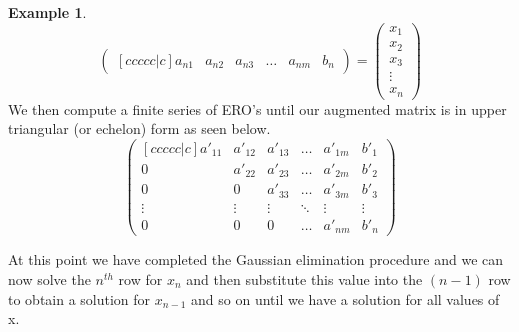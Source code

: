 \documentclass[12pt,reqno,twoside,titlepage]{article}
\theoremstyle{definition}
\newtheorem{exmp}{Example}[section]
\begin{document}
\begin{exmp}
\begin{equation*}
\begin{pmatrix}[ccccc|c]
a_{n1} & a_{n2} & a_{n3} & \dots & a_{nm} & b_{n}
\end{pmatrix}
=
\begin{pmatrix}
x_{1} \\
x_{2} \\
x_{3} \\
\vdots \\
x_{n}
\end{pmatrix}
\end{equation*}
We then compute a finite series of ERO’s until our augmented matrix is in upper triangular (or echelon) form as seen below.
\begingroup
\renewcommand*{\arraystretch}{1.5}
\begin{equation*}
    \begin{pmatrix}[ccccc|c]
    a'_{11} & a'_{12} & a'_{13} & \dots & a'_{1m} & b'_{1} \\
    0 & a'_{22} & a'_{23} & \dots & a'_{2m} & b'_{2} \\
    0 & 0 & a'_{33} & \dots & a'_{3m} & b'_{3} \\
    \vdots & \vdots & \vdots & \ddots & \vdots & \vdots \\
    0 & 0 & 0 & \dots & a'_{nm} & b'_{n}
    \end{pmatrix}
\end{equation*}
\endgroup
\end{exmp}
At this point we have completed the Gaussian elimination procedure and we can now solve the $n^{th}$ row for $x_{n}$ and then substitute this value into the $(n-1)$ row to obtain a solution for $x_{n-1}$ and so on until we have a solution for all values of x.
\newline
\end{document}
